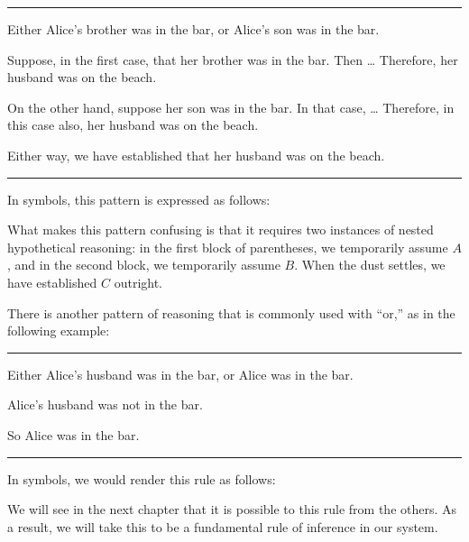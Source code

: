 \documentclass[letterpaper,10pt,english]{sphinxmanual}
\begin{document}
\bigskip\hrule\bigskip


\sphinxAtStartPar
Either Alice’s brother was in the bar, or Alice’s son was in the bar.

\sphinxAtStartPar
Suppose, in the first case, that her brother was in the bar. Then … Therefore, her husband was on the beach.

\sphinxAtStartPar
On the other hand, suppose her son was in the bar. In that case, … Therefore, in this case also, her husband was on the beach.

\sphinxAtStartPar
Either way, we have established that her husband was on the beach.


\bigskip\hrule\bigskip


\sphinxAtStartPar
In symbols, this pattern is expressed as follows:



\begin{center}
\AXM{}
\noLine
\UIM{\vdots}
\noLine
{}
\AXM{}
\noLine
\UIM{\vdots}
\noLine
{}
\DP
\end{center}

\sphinxAtStartPar
What makes this pattern confusing is that it requires two instances of nested hypothetical reasoning: in the first block of parentheses, we temporarily assume \(A\), and in the second block, we temporarily assume \(B\). When the dust settles, we have established \(C\) outright.

\sphinxAtStartPar
There is another pattern of reasoning that is commonly used with “or,”
as in the following example:


\bigskip\hrule\bigskip


\sphinxAtStartPar
Either Alice’s husband was in the bar, or Alice was in the bar.

\sphinxAtStartPar
Alice’s husband was not in the bar.

\sphinxAtStartPar
So Alice was in the bar.


\bigskip\hrule\bigskip


\sphinxAtStartPar
In symbols, we would render this rule as follows:



\begin{center}
\DP
\end{center}

\sphinxAtStartPar
We will see in the next chapter that it is possible to  this rule from the others. As a result, we will  take this to be a fundamental rule of inference in our system.
\end{document}
